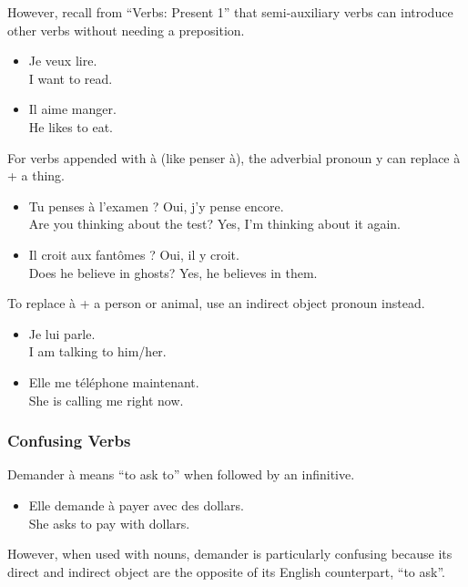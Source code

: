 However, recall from ``Verbs: Present 1'' that semi-auxiliary verbs can introduce other verbs without needing a preposition.

\begin{itemize}
  \item  Je veux lire. \\ I want to read.
	\item  Il aime manger. \\ He likes to eat.
\end{itemize}

For verbs appended with {\`a} (like penser {\`a}), the adverbial pronoun y can replace {\`a} + a thing.

\begin{itemize}
  \item  Tu penses {\`a} l'examen ? Oui, j'y pense encore. \\ Are you thinking about the test? Yes, I'm thinking about it again.
	\item  Il croit aux fant{\^o}mes ? Oui, il y croit. \\ Does he believe in ghosts? Yes, he believes in them.
\end{itemize}

To replace {\`a} + a person or animal, use an indirect object pronoun instead.

\begin{itemize}
  \item  Je lui parle. \\ I am talking to him/her.
	\item  Elle me t{\'e}l{\'e}phone maintenant. \\ She is calling me right now.
\end{itemize}

\subsubsection{Confusing Verbs}

Demander {\`a} means ``to ask to'' when followed by an infinitive.

\begin{itemize}
  \item  Elle demande {\`a} payer avec des dollars. \\ She asks to pay with dollars.
\end{itemize}

However, when used with nouns, demander is particularly confusing because its direct and indirect object are the opposite of its English counterpart, ``to ask''.

